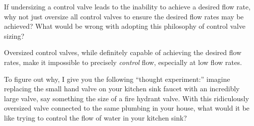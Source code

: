 

If undersizing a control valve leads to the inability to achieve a desired flow rate, why not just oversize all control valves to ensure the desired flow rates may be achieved?  What would be wrong with adopting this philosophy of control valve sizing?







Oversized control valves, while definitely capable of achieving the desired flow rates, make it impossible to precisely {\it control} flow, especially at low flow rates.

\vskip 10pt

To figure out why, I give you the following ``thought experiment:'' imagine replacing the small hand valve on your kitchen sink faucet with an incredibly large valve, say something the size of a fire hydrant valve.  With this ridiculously oversized valve connected to the same plumbing in your house, what would it be like trying to control the flow of water in your kitchen sink?
 









